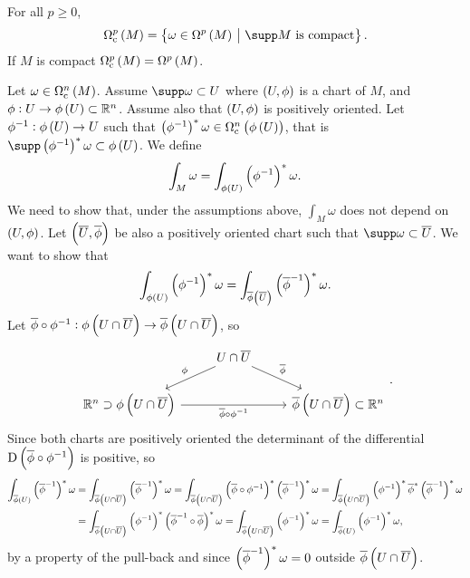 
\begin{notation}
For all $ p \ge 0 $,
$$ \Omega_\c^p\br{M} = \cbr{\omega \in \Omega^p\br{M} \st \supp M \ \text{is compact}}. $$
If $ M $ is compact $ \Omega_\c^p\br{M} = \Omega^p\br{M} $.
\end{notation}

Let $ \omega \in \Omega_\c^n\br{M} $. Assume $ \supp \omega \subset U $ where $ \br{U, \phi} $ is a chart of $ M $, and $ \phi : U \to \phi\br{U} \subset \RR^n $. Assume also that $ \br{U, \phi} $ is positively oriented. Let $ \phi^{-1} : \phi\br{U} \to U $ such that $ \br{\phi^{-1}}^*\omega \in \Omega_\c^n\br{\phi\br{U}} $, that is $ \supp \br{\phi^{-1}}^*\omega \subset \phi\br{U} $. We define
\begin{equation}
\label{eq:1}
\int_M \omega = \int_{\phi\br{U}} \br{\phi^{-1}}^*\omega.
\end{equation}
We need to show that, under the assumptions above, $ \int_M \omega $ does not depend on $ \br{U, \phi} $. Let $ \br{\overline{U}, \overline{\phi}} $ be also a positively oriented chart such that $ \supp \omega \subset \overline{U} $. We want to show that
$$ \int_{\phi\br{U}} \br{\phi^{-1}}^*\omega = \int_{\overline{\phi}\br{\overline{U}}} \br{\overline{\phi}^{-1}}^*\omega. $$
Let $ \overline{\phi} \circ \phi^{-1} : \phi\br{U \cap \overline{U}} \to \overline{\phi}\br{U \cap \overline{U}} $, so
$$
\begin{tikzcd}
& U \cap \overline{U} \arrow{dl}[swap]{\phi} \arrow{dr}{\overline{\phi}} & \\
\RR^n \supset \phi\br{U \cap \overline{U}} \arrow{rr}[swap]{\overline{\phi} \circ \phi^{-1}} & & \overline{\phi}\br{U \cap \overline{U}} \subset \RR^n
\end{tikzcd}.
$$
Since both charts are positively oriented the determinant of the differential $ \D\br{\overline{\phi} \circ \phi^{-1}} $ is positive, so
\begin{align*}
\int_{\overline{\phi}\br{U}} \br{\overline{\phi}^{-1}}^*\omega
& = \int_{\overline{\phi}\br{U \cap \overline{U}}} \br{\overline{\phi}^{-1}}^*\omega
= \int_{\overline{\phi}\br{U \cap \overline{U}}} \br{\overline{\phi} \circ \phi^{-1}}^*\br{\overline{\phi}^{-1}}^*\omega
= \int_{\overline{\phi}\br{U \cap \overline{U}}} \br{\phi^{-1}}^*\overline{\phi}^*\br{\overline{\phi}^{-1}}^*\omega \\
& = \int_{\overline{\phi}\br{U \cap \overline{U}}} \br{\phi^{-1}}^*\br{\overline{\phi}^{-1} \circ \overline{\phi}}^*\omega
= \int_{\overline{\phi}\br{U \cap \overline{U}}} \br{\phi^{-1}}^*\omega
= \int_{\overline{\phi}\br{U}} \br{\phi^{-1}}^*\omega,
\end{align*}
by a property of the pull-back and since $ \br{\overline{\phi}^{-1}}^*\omega = 0 $ outside $ \overline{\phi}\br{U \cap \overline{U}} $.


